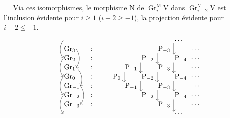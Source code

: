 \documentclass[11pt,leqno]{article}
\newcommand{\Page}[1]{\ifvmode\noindent\else\unskip\ \fi{\footnotesize\textcolor{gray}{[p.\,#1]}}\ \ignorespaces}
\begin{document}
\Page{166}
Via ces isomorphismes, le morphisme \(\mathrm{N}\) de \(\operatorname{Gr}_i^{\mathrm{M}}\mathrm{V}\) dans \(\operatorname{Gr}_{i-2}^{\mathrm{M}}\mathrm{V}\) est l’inclusion évidente pour \(i\ge1\) (\(i-2\ge-1\)), la projection évidente pour \(i-2\le-1\).
\[
\begin{tikzcd}[
  ampersand replacement=\&,
  row sep=0.2em,
  column sep=0.4em,
  cells={nodes={anchor=west,inner sep=1pt}}
]
\phantom{\operatorname{Gr}_4}
  \arrow[dd,bend right=35,start anchor=west,end anchor=west]
  \&[0.8em] \&[2em] \& \& \& \&
  \cdots\arrow[dd,start anchor=south west,end anchor=north west] \& \\
\operatorname{Gr}_3
  \arrow[dd,bend left=35,start anchor=east,end anchor=east]
  \& \colon \& \& \& \&
  \mathrm{P}_{-3}\arrow[dd,start anchor=south west,end anchor=north west]
  \& \& \cdots \\
\operatorname{Gr}_2
  \arrow[dd,bend right=35,start anchor=west,end anchor=west]
  \& \colon \& \& \&
  \mathrm{P}_{-2}\arrow[dd,start anchor=south west,end anchor=north west]
  \& \&
  \mathrm{P}_{-4}\arrow[dd,start anchor=south west,end anchor=north west]
  \& \cdots \\
\operatorname{Gr}_1
  \arrow[dd,bend left=35,start anchor=east,end anchor=east]
  \& \colon \& \&
  \mathrm{P}_{-1}\arrow[dd,start anchor=south west,end anchor=north west]
  \& \&
  \mathrm{P}_{-3}\arrow[dd,start anchor=south west,end anchor=north west]
  \& \& \cdots \\
\operatorname{Gr}_0
  \arrow[dd,bend right=35,start anchor=west,end anchor=west]
  \& \colon \& \mathrm{P}_0 \& \&
  \mathrm{P}_{-2}\arrow[dd,start anchor=south west,end anchor=north west]
  \& \&
  \mathrm{P}_{-4}\arrow[dd,start anchor=south west,end anchor=north west]
  \& \cdots \\
\operatorname{Gr}_{-1}
  \arrow[dd,bend left=35,start anchor=east,end anchor=east]
  \& \colon \& \& \mathrm{P}_{-1} \& \&
  \mathrm{P}_{-3}\arrow[dd,start anchor=south west,end anchor=north west]
  \& \& \cdots \\
\operatorname{Gr}_{-2}
  \arrow[dd,bend right=35,start anchor=west,end anchor=west]
  \& \colon \& \& \& \mathrm{P}_{-2} \& \&
  \mathrm{P}_{-4}\arrow[dd,start anchor=south west,end anchor=north west]
  \& \cdots \\
\operatorname{Gr}_{-3}
  \& \colon \& \& \& \& \mathrm{P}_{-3} \& \& \cdots \\
\phantom{\operatorname{Gr}_{-4}}
  \& \& \& \& \& \& \cdots \&
\end{tikzcd}
\]
\end{document}
